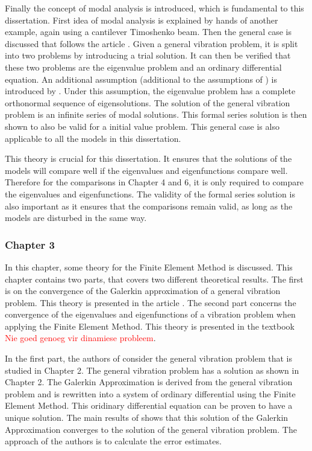 \documentclass[../main.tex]{subfiles}
\begin{document}
Finally the concept of modal analysis is introduced, which is fundamental to this dissertation. First idea of modal analysis is explained by hands of another example, again using a cantilever Timoshenko beam. Then the general case is discussed that follows the article \cite{CVV18}. Given a general vibration problem, it is split into two problems by introducing a trial solution. It can then be verified that these two problems are the eigenvalue problem and an ordinary differential equation. An additional assumption (additional to the assumptions of \cite{VV02}) is introduced by \cite{CVV18}. Under this assumption, the eigenvalue problem has a complete orthonormal sequence of eigensolutions. The solution of the general vibration problem is an infinite series of modal solutions. This formal series solution is then shown to also be valid for a initial value problem. This general case is also applicable to all the models in this dissertation.

This theory is crucial for this dissertation. It ensures that the solutions of the models will compare well if the eigenvalues and eigenfunctions compare well. Therefore for the comparisons in Chapter 4 and 6, it is only required to compare the eigenvalues and eigenfunctions. The validity of the formal series solution is also important as it ensures that the comparisons remain valid, as long as the models are disturbed in the same way.

\subsubsection{Chapter 3}
In this chapter, some theory for the Finite Element Method is discussed. This chapter contains two parts, that covers two different theoretical results. The first is on the convergence of the Galerkin approximation of a general vibration problem. This theory is presented in the article \cite{BV13}. The second part concerns the convergence of the eigenvalues and eigenfunctions of a vibration problem when applying the Finite Element Method. This theory is presented in the textbook \cite{SF97}\textcolor{red}{Nie goed genoeg vir dinamiese probleem}. 

In the first part, the authors of \cite{BV13} consider the general vibration problem that is studied in Chapter 2. The general vibration problem has a solution as shown in Chapter 2. The Galerkin Approximation is derived from the general vibration problem and is rewritten into a system of ordinary differential using the Finite Element Method. This oridinary differential equation can be proven to have a unique solution. The main results of \cite{BV13} shows that this solution of the Galerkin Approximation converges to the solution of the general vibration problem. The approach of the authors is to calculate the error estimates.
\end{document}

